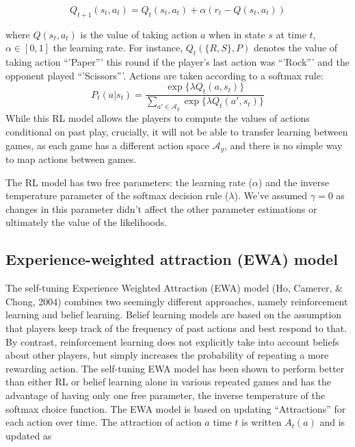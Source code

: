 \documentclass[man,floatsintext]{apa6}
\begin{document}
\[ Q_{t+1}(s_{t},a_{t}) = Q_{t}(s_{t},a_{t}) + \alpha \left( r_{t}  - Q(s_{t},a_{t}) \right) \]

where \(Q(s_{t},a_{t})\) is the value of taking action \(a\) when in state \(s\) at time \(t\), \(\alpha \in [0,1]\) the learning rate. For instance, \(Q_t(\{R,S\},P)\) denotes the value of taking action \enquote{'Paper}' this round if the player's last action was \enquote{'Rock}' and the opponent played \enquote{'Scissors}'. Actions are taken according to a softmax rule:
\[P_{t}(a|s_t) = \frac{\exp \{ \lambda Q_{t}(a,s_t) \}}{\sum_{a' \in \mathcal{A}_g} \exp \{\lambda  Q_{t}(a',s_t) \}}\]
While this RL model allows the players to compute the values of actions conditional on past play, crucially, it will not be able to transfer learning between games, as each game has a different action space \(\mathcal{A}_g\), and there is no simple way to map actions between games.

The RL model has two free parameters: the learning rate (\(\alpha\)) and the inverse temperature parameter of the softmax decision rule (\(\lambda\)). We've assumed \(\gamma = 0\) as changes in this parameter didn't affect the other parameter estimations or ultimately the value of the likelihoods.

\hypertarget{experience-weighted-attraction-ewa-model}{%
\subsection{Experience-weighted attraction (EWA) model}\label{experience-weighted-attraction-ewa-model}}

The self-tuning Experience Weighted Attraction (EWA) model (Ho, Camerer, \& Chong, 2004) combines two seemingly different approaches, namely reinforcement learning and belief learning. Belief learning models are based on the assumption that players keep track of the frequency of past actions and best respond to that. By contrast, reinforcement learning does not explicitly take into account beliefs about other players, but simply increases the probability of repeating a more rewarding action. The self-tuning EWA model has been shown to perform better than either RL or belief learning alone in various repeated games and has the advantage of having only one free parameter, the inverse temperature of the softmax choice function. The EWA model is based on updating ``Attractions'' for each action over time. The attraction of action \(a\) time \(t\) is written \(A_{t}(a)\) and is updated as
\end{document}
